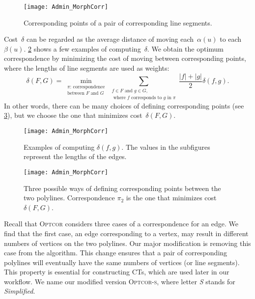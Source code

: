 \begin{figure}[tb]
	\centering
	\texttt{[image: Admin\_MorphCorr]}
	\caption{Corresponding points of 
	a pair of corresponding line segments.}
	\label{fig:Admin_Integral_Correspondence}
\end{figure}

Cost~$\delta$ can be regarded as the average distance of 
moving each~$\alpha(u)$ to each~$\beta(u)$.
\fig\ref{fig:Admin_IntegralComputation} 
shows a few examples of computing~$\delta$. 
We obtain the optimum correspondence by
minimizing the cost of moving between corresponding points, 
where the lengths of line segments are used as weights:
\[
\delta(F,G) =
\min_
{\substack
	{\pi \text{: correspondence} \\ 
		\text{between $F$ and $G$}
	}
} 
\sum_
{\substack
	{f\in F \text{ and }g\in G, \\ 
		\text{ where } f \text{ corresponds to } g \text{ in } 
		\pi
	}
}
\frac{|f|+|g|}{2} \delta(f,g).
\]
In other words, there can be many choices of 
defining corresponding points
(see \fig\ref{fig:Admin_ChooseCorrespondence}),
but we choose the one that minimizes cost~$\delta(F,G)$.


\begin{figure}[tb]
	\centering
	\texttt{[image: Admin\_MorphCorr]}
	\caption{Examples of computing $\delta(f,g)$. 
	The values in the subfigures 
	represent the lengths of the edges.}
	\label{fig:Admin_IntegralComputation}
\end{figure}

\begin{figure}[tb]
	\centering
	\texttt{[image: Admin\_MorphCorr]}
	\caption{Three possible ways of defining corresponding points
		between the two polylines.
		Correspondence $\pi_2$ is the one 
		that minimizes cost~$\delta(F,G)$.
	}
	\label{fig:Admin_ChooseCorrespondence}
\end{figure}

Recall that \textsc{Optcor} considers three cases of a 
correspondence for an edge. 
We find that the first case, an edge corresponding to a vertex, 
may result in different numbers of vertices 
on the two polylines.  
Our major modification is removing this case 
from the algorithm.
This change ensures that
a pair of corresponding polylines 
will eventually have the same 
numbers of vertices (or line segments).
This property is essential for 
constructing CTs, 
which are used later in our workflow.  
We name our modified version \textsc{Optcor-s}, 
where letter \emph{S} stands for \emph{Simplified}.

